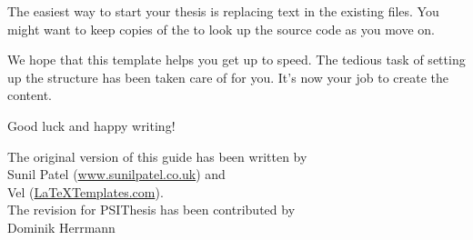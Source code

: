 The easiest way to start your thesis is replacing text in the existing files. You might want to keep copies of the  to look up the source code as you move on.

We hope that this template helps you get up to speed. The tedious task of setting up the structure has been taken care of for you. It's now your job to create the content.

Good luck and happy writing!

\begin{flushright}
The original version of this guide has been written by\\
Sunil Patel (\href{http://www.sunilpatel.co.uk}{www.sunilpatel.co.uk}) and\\
Vel (\href{http://www.LaTeXTemplates.com}{LaTeXTemplates.com}).\\[2ex]
The revision for PSIThesis has been contributed by\\
Dominik Herrmann
\end{flushright}